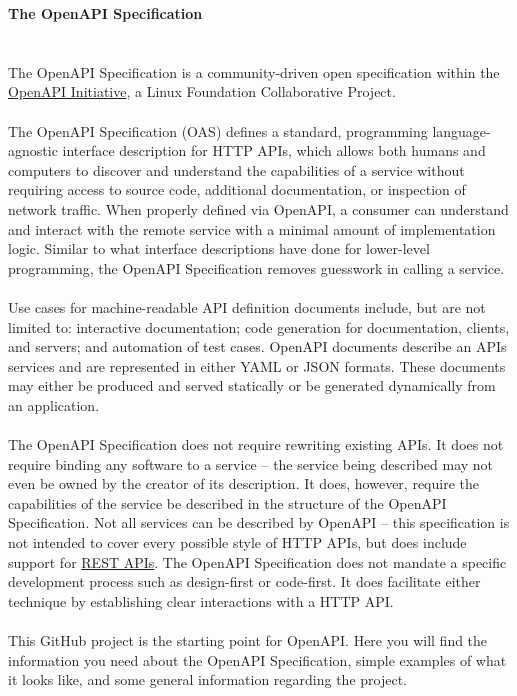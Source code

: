 \documentclass{article}
\begin{document}
{\noindent \Huge \textbf{The OpenAPI Specification}}\\\\
\\
The OpenAPI Specification is a community-driven open specification within the \href{https://www.openapis.org/}{OpenAPI Initiative}, a Linux Foundation Collaborative Project.\\
\\
The OpenAPI Specification (OAS) defines a standard, programming language-agnostic interface description for HTTP APIs, which allows both humans and computers to discover and understand the capabilities of a service without requiring access to source code, additional documentation, or inspection of network traffic. When properly defined via OpenAPI, a consumer can understand and interact with the remote service with a minimal amount of implementation logic. Similar to what interface descriptions have done for lower-level programming, the OpenAPI Specification removes guesswork in calling a service.\\
\\
Use cases for machine-readable API definition documents include, but are not limited to: interactive documentation; code generation for documentation, clients, and servers; and automation of test cases. OpenAPI documents describe an APIs services and are represented in either YAML or JSON formats. These documents may either be produced and served statically or be generated dynamically from an application.\\
\\
The OpenAPI Specification does not require rewriting existing APIs. It does not require binding any software to a service – the service being described may not even be owned by the creator of its description. It does, however, require the capabilities of the service be described in the structure of the OpenAPI Specification. Not all services can be described by OpenAPI – this specification is not intended to cover every possible style of HTTP APIs, but does include support for \href{https://en.wikipedia.org/wiki/Representational_state_transfer}{REST APIs}. The OpenAPI Specification does not mandate a specific development process such as design-first or code-first. It does facilitate either technique by establishing clear interactions with a HTTP API.\\
\\
This GitHub project is the starting point for OpenAPI. Here you will find the information you need about the OpenAPI Specification, simple examples of what it looks like, and some general information regarding the project.\\
\end{document}
